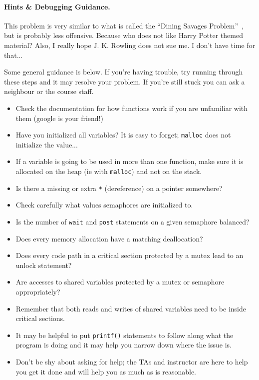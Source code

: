 \paragraph{Hints \& Debugging Guidance.}
This problem is very similar to what is called the ``Dining Savages Problem''~\cite{lbs}, but is probably less offensive. Because who does not like Harry Potter themed material? Also, I really hope J. K. Rowling does not sue me. I don't have time for that...

Some general guidance is below. If you're having trouble, try running through these steps and it may resolve your problem. If you're still stuck you can ask a neighbour or the course staff.
\begin{itemize}
	\item Check the documentation for how functions work if you are unfamiliar with them (google is your friend!)
	\item Have you initialized all variables? It is easy to forget; \texttt{malloc} does not initialize the value...
	\item If a variable is going to be used in more than one function, make sure it is allocated on the heap (ie with \texttt{malloc}) and not on the stack.
	\item Is there a missing or extra \texttt{*} (dereference) on a pointer somewhere?
	\item Check carefully what values semaphores are initialized to.
	\item Is the number of \texttt{wait} and \texttt{post} statements on a given semaphore balanced?
	\item Does every memory allocation have a matching deallocation?
	\item Does every code path in a critical section protected by a mutex lead to an unlock statement?
	\item Are accesses to shared variables protected by a mutex or semaphore appropriately?
	\item Remember that both reads and writes of shared variables need to be inside critical sections.
	\item It may be helpful to put \texttt{printf()} statements to follow along what the program is doing and it may help you narrow down where the issue is.
	\item Don't be shy about asking for help; the TAs and instructor are here to help you get it done and will help you as much as is reasonable.
\end{itemize}



